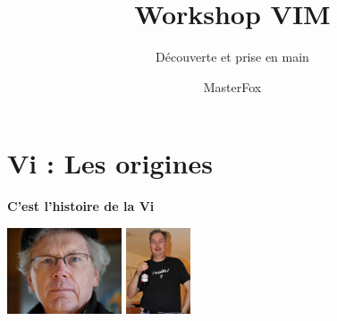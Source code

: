 \documentclass[10pt]{beamer}
\title{Workshop VIM}
\subtitle{Découverte et prise en main}
\author{MasterFox}
\begin{document}
\maketitle

\section{Vi : Les origines}
\begin{frame}{\textbf{C'est l'histoire de la Vi}}

	\center
	\includegraphics[height=96]{img/bill-joy.jpeg}
	\includegraphics[height=96]{img/bram-moolenaar.jpg}


\end{frame}
\end{document}
